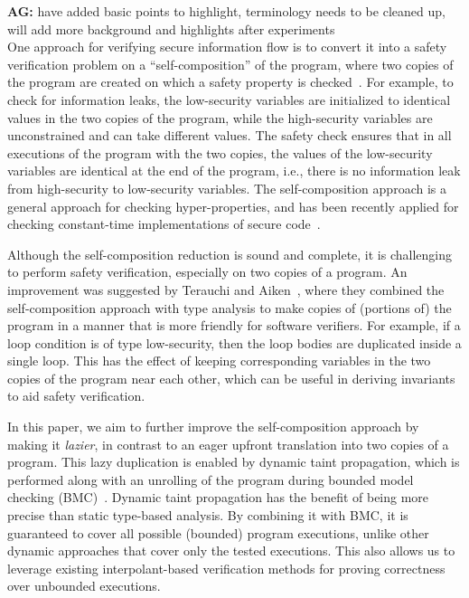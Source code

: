 
{\bf AG:} have added basic points to highlight, terminology needs to be cleaned up, will add more background and highlights after experiments \\

One approach for verifying secure information flow is to convert it into a safety verification problem on a ``self-composition'' of the program, where two copies of the program are created on which a safety property is checked~\cite{BartheCsfw04}. For example, to check for information leaks, the low-security variables are initialized to identical values in the two copies of the program, while the high-security variables are unconstrained and can take different values. The safety check ensures that in all executions of the program with the two copies, the values of the low-security variables are identical at the end of the program, i.e., there is no information leak from high-security to low-security variables. The self-composition approach is a general approach for checking hyper-properties, and has been recently applied for checking constant-time implementations of secure 
code~\cite{AlmeidaUsenix16}. 

Although the self-composition reduction is sound and complete, it is challenging to perform safety verification, especially on two copies of a program. An improvement was suggested by Terauchi and Aiken~\cite{TerauchiSas05}, where they combined the self-composition approach with type analysis to make copies of (portions of) the program in a manner that is more friendly for software verifiers. For example, if a loop condition is of type low-security, then the loop bodies are duplicated inside a single loop. This has the effect of keeping corresponding variables in the two copies of the program near each other, which can be useful in deriving invariants to aid safety verification. 

In this paper, we aim to further improve the self-composition approach by making it \emph{lazier}, in contrast to an eager upfront translation into two copies of a program. This lazy duplication is enabled by dynamic taint propagation, which is performed along with an unrolling of the program during bounded model checking (BMC)~\cite{BiereBmc}. Dynamic taint propagation has the benefit of being more precise than static type-based analysis. By combining it with BMC, it is guaranteed to cover all possible (bounded) program executions, unlike other dynamic approaches that cover only the tested executions. This also allows us to leverage existing interpolant-based verification methods for proving correctness over unbounded executions.

